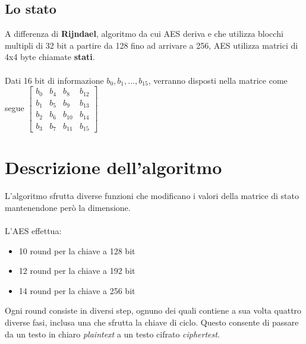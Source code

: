 \subsection{Lo stato}
A differenza di \textbf{Rijndael}, algoritmo da cui AES deriva e che utilizza blocchi multipli di 32 bit a partire da 128 fino ad arrivare a 256, AES utilizza matrici di 4x4 byte chiamate \textbf{stati}.
\paragraph{} Dati 16 bit di informazione \(b_0,b_1,...,b_15\), verranno disposti nella matrice come segue
\(
\begin{bmatrix}
b_0 & b_4 & b_8 & b_{12} \\
b_1 & b_5 & b_9 & b_{13} \\
b_2 & b_6 & b_{10} & b_{14} \\
b_3 & b_7 & b_{11} & b_{15}
\end{bmatrix}
\)

\section{Descrizione dell'algoritmo}
L'algoritmo sfrutta diverse funzioni che modificano i valori della matrice di stato mantenendone però la dimensione. 
\paragraph{}
L'AES effettua:
\begin{itemize}
\item 10 round per la chiave a 128 bit
\item 12 round per la chiave a 192 bit
\item 14 round per la chiave a 256 bit
\end{itemize}

Ogni round consiste in diversi step, ognuno dei quali contiene  a sua volta quattro diverse fasi, inclusa una che sfrutta la chiave di ciclo. Questo consente di passare da un testo in chiaro \textit{plaintext} a un testo cifrato \textit{ciphertest}.


